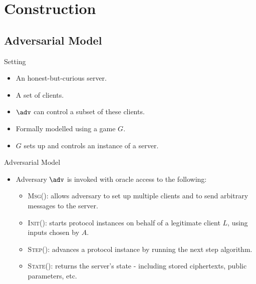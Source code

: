 \documentclass{beamer}
\newcommand{\scheme}{\mathsf{DD-Across}}
\begin{document}

\section{Construction}
\subsection{Adversarial Model}
\begin{frame}{Setting}
	\begin{itemize}
		\setlength\itemsep{1em}
		\item An honest-but-curious server.
		\item A set of clients.
		\item $\adv$ can control a subset of these clients.
		\item Formally modelled using a game $G$.
		\item $G$ sets up and controls an instance of a server.
		
	\end{itemize}
\end{frame}

\begin{frame}{Adversarial Model}
	\begin{itemize}
		\setlength\itemsep{1em}
        \item Adversary $\adv$ is invoked with oracle access to the following:\\
        \begin{itemize}
            \setlength\itemsep{1em}
            \item \textsc{Msg()}: allows adversary to set up multiple clients and to send arbitrary messages to the server.
            \item \textsc{Init()}: starts protocol instances on behalf of a legitimate client $L$, using inputs chosen by $A$.
            \item \textsc{Step()}: advances a  protocol instance by running the next step algorithm.
            \item \textsc{State()}: returns the server's state - including stored ciphertexts, public parameters, etc.
        \end{itemize}
    \end{itemize}
\end{frame}
\end{document}
